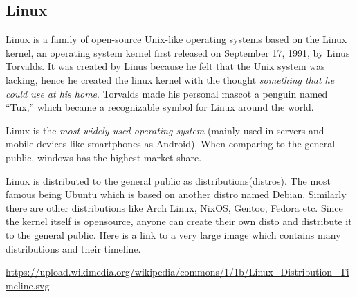 \newpage
\subsection{Linux}

Linux is a family of open-source Unix-like operating systems based on the Linux kernel, an operating system kernel first released on September 17, 1991, by Linus Torvalds. It was created by Linus because he felt that the Unix system was lacking, hence he created the linux kernel with the thought \emph{something that he could use at his home}. Torvalds made his personal mascot a penguin named “Tux,” which became a recognizable symbol for Linux around the world. \cite{wikipediaLinuxWikipedia, mitLinusTorvalds}

Linux is the \emph{most widely used operating system} (mainly used in servers and mobile devices like smartphones as Android). When comparing to the general public, windows has the highest market share.

Linux is distributed to the general public as distributions(distros). The most famous being Ubuntu which is based on another distro named Debian. Similarly there are other distributions like Arch Linux, NixOS, Gentoo, Fedora etc. Since the kernel itself is opensource, anyone can create their own disto and distribute it to the general public. Here is a link to a very large image which contains many distributions and their timeline.

\url{https://upload.wikimedia.org/wikipedia/commons/1/1b/Linux_Distribution_Timeline.svg}


\clearpage%
{}

